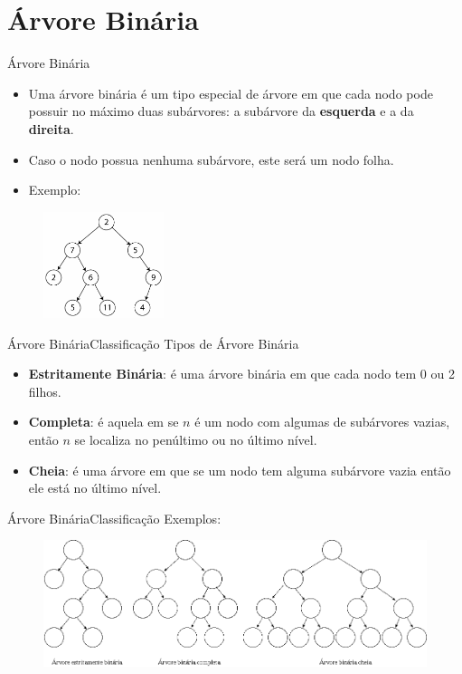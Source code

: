 \documentclass[aspectratio=169]{beamer}
\begin{document}
\section{Árvore Binária}

\begin{frame}{Árvore Binária}
\begin{itemize}
 \item Uma árvore binária é um tipo especial de árvore em que cada nodo pode possuir no máximo duas subárvores: a subárvore da {\bf esquerda} e a da {\bf direita}.
 \item Caso o nodo possua nenhuma subárvore, este será um nodo folha.
 \item Exemplo:
\end{itemize}
\begin{figure}[!h]
  \centering
   \includegraphics[width=100pt]{imagens/exemplo_arvore_binaria.png}
  \label{fig_exemplo_arvore_binaria}
\end{figure}
\end{frame}

\begin{frame}{Árvore Binária}{Classificação}
Tipos de Árvore Binária
\begin{itemize}
 \item {\bf Estritamente Binária}: é uma árvore binária em que cada nodo tem 0 ou 2 filhos.
 \item {\bf Completa}: é aquela em se $n$ é um nodo com algumas de subárvores vazias, então $n$ se localiza no penúltimo ou no último nível. 
  \item {\bf Cheia}: é uma árvore em que se um nodo tem alguma subárvore vazia então ele está no último nível.
\end{itemize}
\end{frame}


\begin{frame}{Árvore Binária}{Classificação}
Exemplos:
\begin{figure}[!h]
  \centering
  \includegraphics[width=350pt]{imagens/classificacao.png}
  \label{fig_classificacao}
\end{figure}
\end{frame}
\end{document}
